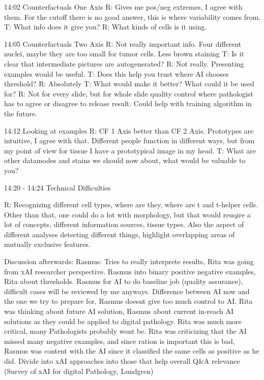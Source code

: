 14:02 Counterfactuals One Axis
R: Gives me pos/neg extremes, I agree with them. For the cutoff there is no good answer, this is where variability comes from.
T: What info does it give you? R: What kinds of cells is it using.

14:05 Counterfactuals Two Axis
R: Not really important info. Four different nuclei, maybe they are too small for tumor cells. Less brown staining
T: Is it clear that intermediate pictures are autogenerated? R: Not really. Presenting examples would be useful.
T: Does this help you trust where AI chooses threshold? R: Absolutely T: What would make it better? What could it be used for?
R: Not for every slide, but for whole slide quality control where pathologist has to agree or disagree to release result. Could help with training algorithm in the future.

14:12 Looking at examples
R: CF 1 Axis better than CF 2 Axis. Prototypes are intuitive, I agree with that. Different people function in different ways, but from my point of view for tissue I have a prototypical image in my head.
T: What are other datamodes and stains we should now about, what would be valuable to you?

14:20 - 14:24 Technical Difficulties

R: Recognizing different cell types, where are they, where are t and t-helper cells. Other than that, one could do a lot with morphology, but that would reuqire a lot of concepts, different information sources, tissue types. Also the aspect of different analyses detecting different things, highlight overlapping areas of mutually exclusive features.

Discussion afterwards:
Rasmus: Tries to really interprete results, Rita was going from xAI researcher perspective. Rasmus into binary positive negative examples, Rita about thresholds. Rasmus for AI to do baseline job (quality assurance), difficult cases will be reviewed by me anyways. Difference between AI now and the one we try to prepare for, Rasmus doesnt give too much control to AI. Rita was thinking about future AI solution, Rasmus about current in-reach AI solutions as they could be applied to digital pathology. Rita was much more critical, many Pathologists probably wont be. Rita was criticizing that the AI missed many negative examples, and since ration is important this is bad, Rasmus was content with the AI since it classified the same cells as positive as he did.
Divide into xAI approaches into those that help overall Q&A relevance (Survey of xAI for digital Pathology, Lundgren)

